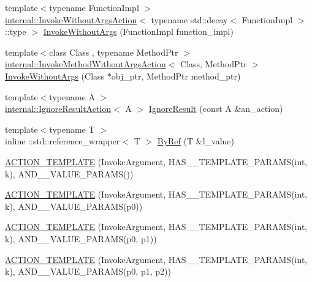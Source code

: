 \begin{DoxyCompactItemize}
\item 
{\footnotesize template$<$typename Function\+Impl $>$ }\\\mbox{\hyperlink{structtesting_1_1internal_1_1_invoke_without_args_action}{internal\+::\+Invoke\+Without\+Args\+Action}}$<$ typename std\+::decay$<$ Function\+Impl $>$\+::type $>$ \mbox{\hyperlink{namespacetesting_aabc08d610483908c8346f2e3318ad449}{Invoke\+Without\+Args}} (Function\+Impl function\+\_\+impl)
\item 
{\footnotesize template$<$class Class , typename Method\+Ptr $>$ }\\\mbox{\hyperlink{structtesting_1_1internal_1_1_invoke_method_without_args_action}{internal\+::\+Invoke\+Method\+Without\+Args\+Action}}$<$ Class, Method\+Ptr $>$ \mbox{\hyperlink{namespacetesting_ab2961856113ff9af02fdf12c71b8a5f5}{Invoke\+Without\+Args}} (Class $\ast$obj\+\_\+ptr, Method\+Ptr method\+\_\+ptr)
\item 
{\footnotesize template$<$typename A $>$ }\\\mbox{\hyperlink{classtesting_1_1internal_1_1_ignore_result_action}{internal\+::\+Ignore\+Result\+Action}}$<$ A $>$ \mbox{\hyperlink{namespacetesting_a257c9395b54e9267a0348a6310128889}{Ignore\+Result}} (const A \&an\+\_\+action)
\item 
{\footnotesize template$<$typename T $>$ }\\inline \+::std\+::reference\+\_\+wrapper$<$ T $>$ \mbox{\hyperlink{namespacetesting_a1f94a81e042d7c40c8359c1471fbb61e}{By\+Ref}} (T \&l\+\_\+value)
\item 
\mbox{\hyperlink{namespacetesting_a8a02397c7fdf8e84d559ab72dcc28eb1}{A\+C\+T\+I\+O\+N\+\_\+\+T\+E\+M\+P\+L\+A\+TE}} (Invoke\+Argument, H\+A\+S\+\_\+\_\+\+T\+E\+M\+P\+L\+A\+T\+E\+\_\+\+P\+A\+R\+A\+MS(int, k), A\+N\+D\+\_\+\_\+\+V\+A\+L\+U\+E\+\_\+\+P\+A\+R\+A\+MS())
\item 
\mbox{\hyperlink{namespacetesting_afaa0d88f5442f9aee5d6147377d3e50c}{A\+C\+T\+I\+O\+N\+\_\+\+T\+E\+M\+P\+L\+A\+TE}} (Invoke\+Argument, H\+A\+S\+\_\+\_\+\+T\+E\+M\+P\+L\+A\+T\+E\+\_\+\+P\+A\+R\+A\+MS(int, k), A\+N\+D\+\_\+\_\+\+V\+A\+L\+U\+E\+\_\+\+P\+A\+R\+A\+MS(p0))
\item 
\mbox{\hyperlink{namespacetesting_a39bf6c49dc1323cc9539a12249e60aba}{A\+C\+T\+I\+O\+N\+\_\+\+T\+E\+M\+P\+L\+A\+TE}} (Invoke\+Argument, H\+A\+S\+\_\+\_\+\+T\+E\+M\+P\+L\+A\+T\+E\+\_\+\+P\+A\+R\+A\+MS(int, k), A\+N\+D\+\_\+\_\+\+V\+A\+L\+U\+E\+\_\+\+P\+A\+R\+A\+MS(p0, p1))
\item 
\mbox{\hyperlink{namespacetesting_ac50647216fdf5197899a3d5034a9a670}{A\+C\+T\+I\+O\+N\+\_\+\+T\+E\+M\+P\+L\+A\+TE}} (Invoke\+Argument, H\+A\+S\+\_\+\_\+\+T\+E\+M\+P\+L\+A\+T\+E\+\_\+\+P\+A\+R\+A\+MS(int, k), A\+N\+D\+\_\+\_\+\+V\+A\+L\+U\+E\+\_\+\+P\+A\+R\+A\+MS(p0, p1, p2))

\end{DoxyCompactItemize}
